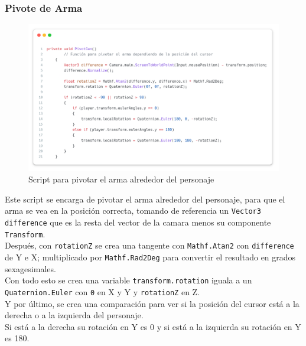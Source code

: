 \documentclass[11pt]{article}
\begin{document}
            \newpage
            \subsubsection{Pivote de Arma}
                \begin{figure}[H]
                    \centering
                    \includegraphics[width=\textwidth]{Images/Misc/pivot.png}
                    \caption{Script para pivotar el arma alrededor del personaje}
                \end{figure}

                Este script se encarga de pivotar el arma alrededor del personaje, para que el arma se vea en la posición correcta, tomando de referencia un \texttt{Vector3 difference} que es la resta del vector de la camara menos su componente \texttt{Transform}.\\

                Después, con \texttt{rotationZ} se crea una tangente con \texttt{Mathf.Atan2} con \texttt{difference} de Y e X; multiplicado por \texttt{Mathf.Rad2Deg} para convertir el resultado en grados sexagesimales. \\

                Con todo esto se crea una variable \texttt{transform.rotation} iguala a un \texttt{Quaternion.Euler} con \texttt{0} en X y Y y \texttt{rotationZ} en Z.\\

                Y por último, se crea una comparación para ver si la posición del cursor está a la derecha o a la izquierda del personaje.\\ 

                Si está a la derecha su rotación en Y es 0 y si está a la izquierda su rotación en Y es 180.\\
\end{document}
